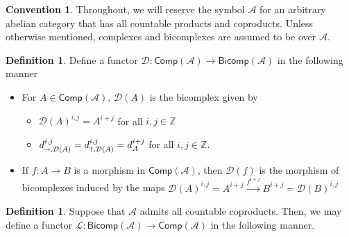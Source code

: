 \documentclass[oneside,11pt]{article}
\theoremstyle{definition}
\newtheorem{defn}[thm]{Definition}
\newtheorem{conv}[thm]{Convention}
\theoremstyle{remark}
\begin{document}
\begin{conv}
	Throughout, we will reserve the symbol $\mathscr{A} $ for an arbitrary abelian category that has all countable products and coproducts. Unless otherwise mentioned, complexes and bicomplexes are assumed to be over $\mathscr{A} $.  
\end{conv}
\begin{defn}
 Define a functor $\mathcal{D}: \textsf{Comp}(\mathscr{A} )  \rightarrow  \textsf{Bicomp}(\mathscr{A} )$ in the following manner
 \begin{itemize}
  \item For $A\in \textsf{Comp}(\mathscr{A} )$, $\mathcal{D}(A)$ is the bicomplex given by
	  \begin{itemize}
	   \item $\mathcal{D}(A)^{i,j}= A^{i+j}$ for all $i,j\in \mathbb{Z} $ 
	 \item $d_{\shortrightarrow , \mathcal{D}(A) }^{i,j}= d_{\shortuparrow , \mathcal{D}(A) }^{i,j} = d_{A}^{i+j}$ for all $i,j\in \mathbb{Z} $. 
	  \end{itemize}
  \item If $f:A \rightarrow B $ is a morphism in $\textsf{Comp}(\mathscr{A} )$, then $\mathcal{D}(f)$ is the morphism of bicomplexes induced by the maps $\mathcal{D}(A)^{i,j} = A^{i+j} \xrightarrow{f^{i+j}} B^{i+j}= \mathcal{D}(B)^{i,j}$ 
 \end{itemize}
\end{defn}



\begin{defn}
 Suppose that $\mathscr{A}$ admits all countable coproducts. Then, we may define a functor $\mathcal{L}:\textsf{Bicomp}(\mathscr{A} )  \rightarrow \textsf{Comp}(\mathscr{A} ) $ in the following manner.  
\end{defn}
\end{document}
